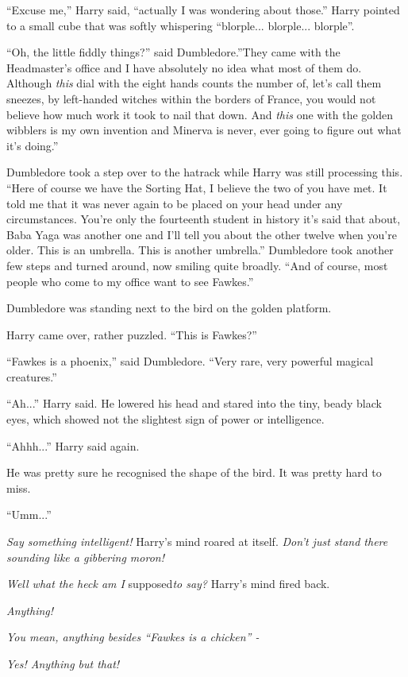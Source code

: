 ``Excuse me,'' Harry said, ``actually I was wondering about those.''
Harry pointed to a small cube that was softly whispering
``blorple... blorple... blorple''.

``Oh, the little fiddly things?'' said Dumbledore.''They came with the
Headmaster's office and I have absolutely no idea what most of them do.
Although \emph{this} dial with the eight hands counts the number of,
let's call them sneezes, by left-handed witches within the borders of
France, you would not believe how much work it took to nail that down.
And \emph{this} one with the golden wibblers is my own invention and
Minerva is never, ever going to figure out what it's doing.''

Dumbledore took a step over to the hatrack while Harry was still
processing this. ``Here of course we have the Sorting Hat, I believe the
two of you have met. It told me that it was never again to be placed on
your head under any circumstances. You're only the fourteenth student in
history it's said that about, Baba Yaga was another one and I'll tell
you about the other twelve when you're older. This is an umbrella. This
is another umbrella.'' Dumbledore took another few steps and turned
around, now smiling quite broadly. ``And of course, most people who come
to my office want to see Fawkes.''

Dumbledore was standing next to the bird on the golden platform.

Harry came over, rather puzzled. ``This is Fawkes?''

``Fawkes is a phoenix,'' said Dumbledore. ``Very rare, very powerful
magical creatures.''

``Ah...'' Harry said. He lowered his head and stared into the tiny,
beady black eyes, which showed not the slightest sign of power or
intelligence.

``Ahhh...'' Harry said again.

He was pretty sure he recognised the shape of the bird. It was pretty
hard to miss.

``Umm...''

\emph{Say something intelligent!} Harry's mind roared at itself.
\emph{Don't just stand there sounding like a gibbering moron!}

\emph{Well what the heck am I} supposed\emph{to say?} Harry's mind fired
back.

\emph{Anything!}

\emph{You mean, anything besides ``Fawkes is a chicken'' -}

\emph{Yes! Anything but that!}

